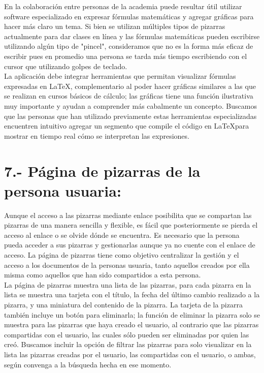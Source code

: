\documentclass[a4paper, oneside, final]{scrartcl}
\begin{document}
     En la colaboración entre personas de la academia puede resultar útil utilizar software especializado en expresar fórmulas matemáticas y agregar gráficas para hacer más claro un tema. Si bien se utilizan múltiples tipos de pizarras actualmente para dar clases en línea y las fórmulas matemáticas pueden escribirse utilizando algún tipo de "pincel", consideramos que no es la forma más eficaz de escribir pues en promedio una persona se tarda más tiempo escribiendo con el cursor que utilizando golpes de teclado.\\
     
     La aplicación debe integrar herramientas que permitan visualizar fórmulas expresadas en
  \LaTeX, complementario al poder hacer gráficas similares a las que se realizan en cursos básicos de cálculo; las gráficas tiene una función ilustrativa muy importante y ayudan a comprender más cabalmente un concepto. Buscamos que las personas que han utilizado previamente estas herramientas especializadas encuentren intuitivo agregar un segmento que compile el código en \LaTeX para mostrar en tiempo real cómo se interpretan las expresiones.



\noindent
\section{ 7.- Página de pizarras de la persona usuaria:}

Aunque el acceso a las pizarras mediante enlace posibilita que se compartan las pizarras de una manera sencilla y flexible, es fácil que posteriormente se pierda el acceso al enlace o se olvide dónde se encuentra. Es necesario que la persona pueda acceder a sus pizarras y gestionarlas aunque ya no cuente con el enlace de acceso. La página de pizarras tiene como objetivo centralizar la gestión y el acceso a los documentos de la personas usuaria, tanto aquellos creados por ella misma como aquellos que han sido compartidos a esta persona.\\

La página de pizarras muestra una lista de las pizarras, para cada pizarra en la lista se muestra una tarjeta con el título, la fecha del último cambio realizado a la pizarra, y una miniatura del contenido de la pizarra. La tarjeta de la pizarra también incluye un botón para eliminarla; la función de eliminar la pizarra solo se muestra para las pizarras que haya creado el usuario, al contrario que las pizarras compartidas con el usuario, las cuales sólo pueden ser eliminadas por quien las creó. Buscamos incluir la opción de filtrar las pizarras para solo visualizar en la lista las pizarras creadas por el usuario, las compartidas con el usuario, o ambas, según convenga a la búsqueda hecha en ese momento.
\end{document}
